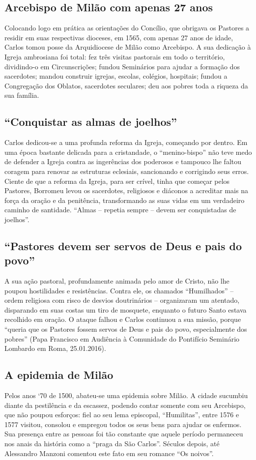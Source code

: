 \documentclass[a4paper,14pt]{extarticle} \usepackage[utf8]{inputenc}
\begin{document}
\subsection{Arcebispo de Milão com apenas 27 anos}
Colocando logo em prática as orientações do Concílio, que obrigava os Pastores a residir em suas respectivas dioceses, em 1565, com apenas 27 anos de idade, Carlos tomou posse da Arquidiocese de Milão como Arcebispo.
A sua dedicação à Igreja ambrosiana foi total: fez três visitas pastorais em todo o território, dividindo-o em Circunscrições; fundou Seminários para ajudar a formação dos sacerdotes; mandou construir igrejas, escolas, colégios, hospitais; fundou a Congregação dos Oblatos, sacerdotes seculares; deu aos pobres toda a riqueza da sua família.
\subsection{``Conquistar as almas de joelhos''}
Carlos dedicou-se a uma profunda reforma da Igreja, começando por dentro. Em uma época bastante delicada para a cristandade, o ``menino-bispo'' não teve medo de defender a Igreja contra as ingerências dos poderosos e tampouco lhe faltou coragem para renovar as estruturas eclesiais, sancionando e corrigindo seus erros.
Ciente de que a reforma da Igreja, para ser crível, tinha que começar pelos Pastores, Borromeu levou os sacerdotes, religiosos e diáconos a acreditar mais na força da oração e da penitência, transformando as suas vidas em um verdadeiro caminho de santidade. ``Almas -- repetia sempre -- devem ser conquistadas de joelhos''.
\subsection{``Pastores devem ser servos de Deus e pais do povo''}
A sua ação pastoral, profundamente animada pelo amor de Cristo, não lhe poupou hostilidades e resistências. Contra ele, os chamados ``Humilhados'' -- ordem religiosa com risco de desvios doutrinários -- organizaram um atentado, disparando em suas costas um tiro de mosquete, enquanto o futuro Santo estava recolhido em oração.
O ataque falhou e Carlos continuou a sua missão, porque ``queria que os Pastores fossem servos de Deus e pais do povo, especialmente dos pobres'' (Papa Francisco em Audiência à Comunidade do Pontifício Seminário Lombardo em Roma, 25.01.2016).
\subsection{A epidemia de Milão}
Pelos anos `70 de 1500, abateu-se uma epidemia sobre Milão. A cidade sucumbiu diante da pestilência e da escassez, podendo contar somente com seu Arcebispo, que não poupou esforços: fiel ao seu lema episcopal, ``Humilitas'', entre 1576 e 1577 visitou, consolou e empregou todos os seus bens para ajudar os enfermos.
Sua presença entre as pessoas foi tão constante que aquele período permaneceu nos anais da história como a ``praga da São Carlos''. Séculos depois, até Alessandro Manzoni comentou este fato em seu romance ``Os noivos''.
\end{document}

